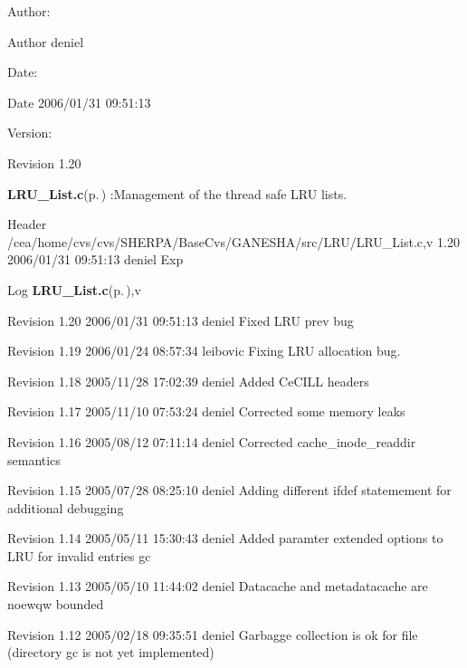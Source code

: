 \begin{Desc}
\item[Author:]\begin{Desc}
\item[Author]deniel \end{Desc}
\end{Desc}
\begin{Desc}
\item[Date:]\begin{Desc}
\item[Date]2006/01/31 09:51:13 \end{Desc}
\end{Desc}
\begin{Desc}
\item[Version:]\begin{Desc}
\item[Revision]1.20 \end{Desc}
\end{Desc}
{\bf LRU\_\-List.c}{\rm (p.\,\pageref{LRU__List_8c})} :Management of the thread safe LRU lists.

\begin{Desc}
\item[Header]/cea/home/cvs/cvs/SHERPA/Base\-Cvs/GANESHA/src/LRU/LRU\_\-List.c,v 1.20 2006/01/31 09:51:13 deniel Exp \end{Desc}


\begin{Desc}
\item[Log]{\bf LRU\_\-List.c}{\rm (p.\,\pageref{LRU__List_8c})},v \end{Desc}
Revision 1.20 2006/01/31 09:51:13 deniel Fixed LRU prev bug

Revision 1.19 2006/01/24 08:57:34 leibovic Fixing LRU allocation bug.

Revision 1.18 2005/11/28 17:02:39 deniel Added Ce\-CILL headers

Revision 1.17 2005/11/10 07:53:24 deniel Corrected some memory leaks

Revision 1.16 2005/08/12 07:11:14 deniel Corrected cache\_\-inode\_\-readdir semantics

Revision 1.15 2005/07/28 08:25:10 deniel Adding different ifdef statemement for additional debugging

Revision 1.14 2005/05/11 15:30:43 deniel Added paramter extended options to LRU for invalid entries gc

Revision 1.13 2005/05/10 11:44:02 deniel Datacache and metadatacache are noewqw bounded

Revision 1.12 2005/02/18 09:35:51 deniel Garbagge collection is ok for file (directory gc is not yet implemented)

